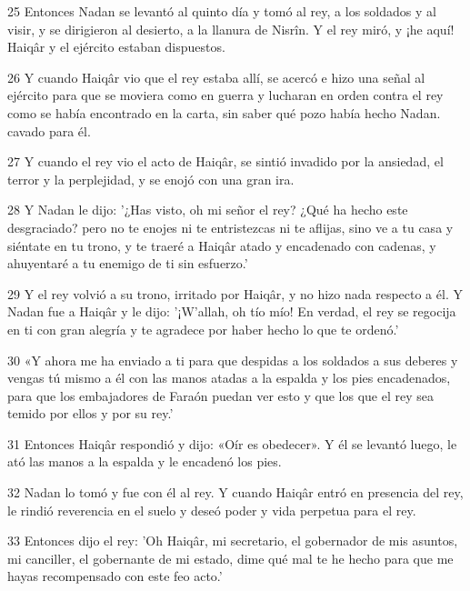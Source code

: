 \par 25 Entonces Nadan se levantó al quinto día y tomó al rey, a los soldados y al visir, y se dirigieron al desierto, a la llanura de Nisrîn. Y el rey miró, y ¡he aquí! Haiqâr y el ejército estaban dispuestos.

\par 26 Y cuando Haiqâr vio que el rey estaba allí, se acercó e hizo una señal al ejército para que se moviera como en guerra y lucharan en orden contra el rey como se había encontrado en la carta, sin saber qué pozo había hecho Nadan. cavado para él.

\par 27 Y cuando el rey vio el acto de Haiqâr, se sintió invadido por la ansiedad, el terror y la perplejidad, y se enojó con una gran ira.

\par 28 Y Nadan le dijo: '¿Has visto, oh mi señor el rey? ¿Qué ha hecho este desgraciado? pero no te enojes ni te entristezcas ni te aflijas, sino ve a tu casa y siéntate en tu trono, y te traeré a Haiqâr atado y encadenado con cadenas, y ahuyentaré a tu enemigo de ti sin esfuerzo.'

\par 29 Y el rey volvió a su trono, irritado por Haiqâr, y no hizo nada respecto a él. Y Nadan fue a Haiqâr y le dijo: '¡W'allah, oh tío mío! En verdad, el rey se regocija en ti con gran alegría y te agradece por haber hecho lo que te ordenó.'

\par 30 «Y ahora me ha enviado a ti para que despidas a los soldados a sus deberes y vengas tú mismo a él con las manos atadas a la espalda y los pies encadenados, para que los embajadores de Faraón puedan ver esto y que los que el rey sea temido por ellos y por su rey.'

\par 31 Entonces Haiqâr respondió y dijo: «Oír es obedecer». Y él se levantó luego, le ató las manos a la espalda y le encadenó los pies.

\par 32 Nadan lo tomó y fue con él al rey. Y cuando Haiqâr entró en presencia del rey, le rindió reverencia en el suelo y deseó poder y vida perpetua para el rey.

\par 33 Entonces dijo el rey: 'Oh Haiqâr, mi secretario, el gobernador de mis asuntos, mi canciller, el gobernante de mi estado, dime qué mal te he hecho para que me hayas recompensado con este feo acto.'

